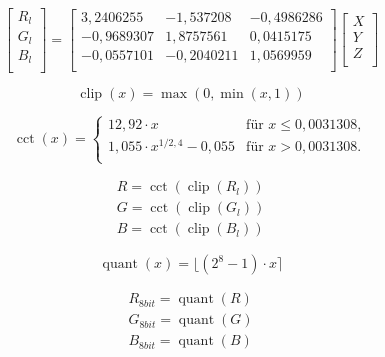 \documentclass[10pt,a4paper,DIV=12,parskip=half]{scrarticle}
\begin{document}
\begin{equation*}
\begin{bmatrix}
R_{l} \\
G_{l} \\
B_{l} \\
\end{bmatrix} =
\begin{bmatrix}
3,2406255 & -1,537208 & -0,4986286 \\
-0,9689307 & 1,8757561 & 0,0415175 \\
-0,0557101 & -0,2040211 & 1,0569959 \\
\end{bmatrix}
\begin{bmatrix}
X \\
Y \\
Z \\
\end{bmatrix}
\end{equation*}

\begin{equation*}
\operatorname{clip}(x)=\operatorname{max}(0, \operatorname{min}(x, 1))
\end{equation*}

\begin{equation*}
\operatorname{cct}(x)=
\begin{cases}
12,92 \cdot x & \text{für } x \leq 0,0031308, \\
1,055 \cdot x^{1/2,4} - 0,055 & \text{für } x > 0,0031308. \\
\end{cases}
\end{equation*}

\begin{equation*}
\begin{gathered}
R = \operatorname{cct}(\operatorname{clip}(R_{l})) \\
G = \operatorname{cct}(\operatorname{clip}(G_{l})) \\
B = \operatorname{cct}(\operatorname{clip}(B_{l}))
\end{gathered}
\end{equation*}

\begin{equation*}
\operatorname{quant}(x) = \lfloor (2^8-1) \cdot x \rceil
\end{equation*}

\begin{equation*}
\begin{gathered}
R_{8bit} = \operatorname{quant}(R) \\
G_{8bit} = \operatorname{quant}(G) \\
B_{8bit} = \operatorname{quant}(B)
\end{gathered}
\end{equation*}
\end{document}
